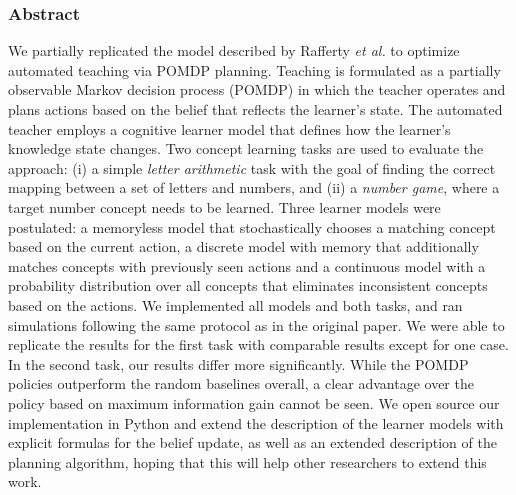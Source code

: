 
\subsubsection{Abstract}
We partially replicated the model described by Rafferty \textit{et al.} to optimize automated teaching via POMDP planning. 
Teaching is formulated as a partially observable Markov decision process (POMDP) in which the teacher operates and plans actions based on the belief that reflects the learner's state.
The automated teacher employs a cognitive learner model that defines how the learner's knowledge state changes.%
Two concept learning tasks are used to evaluate the approach: (i) a simple \textit{letter arithmetic} task with the goal of finding the correct mapping between a set of letters and numbers, and (ii) a \textit{number game}, where a target number concept needs to be learned.
Three learner models were postulated: a memoryless model that stochastically chooses a matching concept based on the current action, a discrete model with memory that additionally matches concepts with previously seen actions and a continuous model with a probability distribution over all concepts that eliminates inconsistent concepts based on the actions.
We implemented all models and both tasks, and ran simulations following the same protocol as in the original paper. We were able to replicate the results for the first task with comparable results except for one case. In the second task, our results differ more significantly.
While the POMDP policies outperform the random baselines overall, a clear advantage over the policy based on maximum information gain cannot be seen.
We open source our implementation in Python and extend the description of the learner models with explicit formulas for the belief update, as well as an extended description of the planning algorithm, hoping that this will help other researchers to extend this work.








